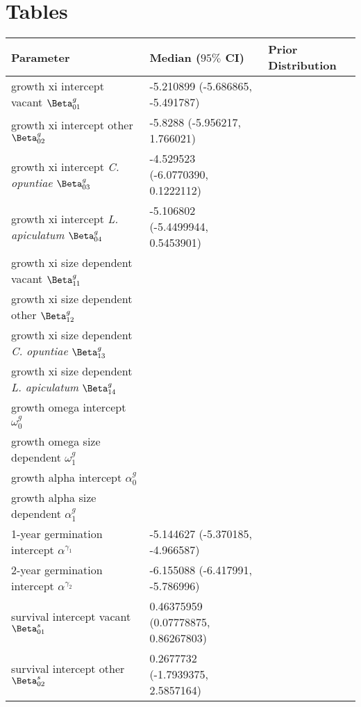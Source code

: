 \documentclass[11pt]{article}
\begin{document}
\newpage{}

\section*{Tables}
\renewcommand{\thetable}{\arabic{table}}
\setcounter{table}{0}

\renewcommand{\thetable}{\arabic{table}}
\setcounter{table}{0}

  \begin{table}[]
  \begin{tabular}{l|l|l}
    \textbf{Parameter} & \textbf{Median ($95\%$ CI)} & \textbf{Prior Distribution} \\
    \hline
    growth xi intercept vacant $\Beta_{01}^g$ & -5.210899 (-5.686865, -5.491787) & \\
    growth xi intercept other $\Beta_{02}^g$ & -5.8288 (-5.956217, 1.766021) & \\
    growth xi intercept \textit{C. opuntiae} $\Beta_{03}^g$ & -4.529523 (-6.0770390, 0.1222112) & \\
    growth xi intercept \textit{L. apiculatum} $\Beta_{04}^g$ & -5.106802 (-5.4499944, 0.5453901) & \\
    growth xi size dependent vacant $\Beta_{11}^g$ & & \\
    growth xi size dependent other $\Beta_{12}^g$ & & \\
    growth xi size dependent \textit{C. opuntiae} $\Beta_{13}^g$ & & \\
    growth xi size dependent \textit{L. apiculatum} $\Beta_{14}^g$ & & \\
    growth omega intercept $\omega_0^g$ & & \\
    growth omega size dependent $\omega_1^g$ & & \\
    growth alpha intercept $\alpha_0^g$ & & \\
    growth alpha size dependent $\alpha_1^g$ & & \\
    \hline
    1-year germination intercept $\alpha^{\gamma_1}$ & -5.144627 (-5.370185, -4.966587) & \\
    2-year germination intercept $\alpha^{\gamma_2}$ & -6.155088 (-6.417991, -5.786996) & \\
    \hline
    survival intercept vacant $\Beta_{01}^s$ & 0.46375959 (0.07778875, 0.86267803) & \\
    survival intercept other $\Beta_{02}^s$ & 0.2677732 (-1.7939375, 2.5857164) & \\

\end{tabular}
\end{table}
\end{document}
